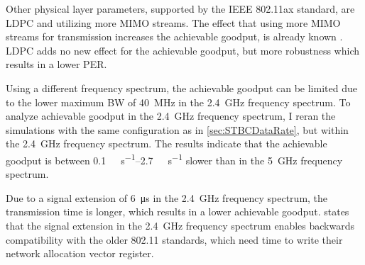 Other physical layer parameters, supported by the IEEE 802.11ax standard, are \ac{LDPC} and utilizing more \ac{MIMO} streams.
The effect that using more \ac{MIMO} streams for transmission increases the achievable goodput, is already known \cite[294-296]{sauter_wireless_2022, ieee_standard_2021ax, ieee_standard_2020}.
\ac{LDPC} adds no new effect for the achievable goodput, but more robustness which results in a lower \ac{PER}.

Using a different frequency spectrum, the achievable goodput can be limited due to the lower maximum \ac{BW} of \SI{40}{\mega\hertz} in the \SI{2.4}{\giga\hertz} frequency spectrum.
To analyze achievable goodput in the \SI{2.4}{\giga\hertz} frequency spectrum, I reran the simulations with the same configuration as in \autoref{sec:STBCDataRate}, but within the \SI{2.4}{\giga\hertz} frequency spectrum.
The results indicate that the achievable goodput is between \SIrange{0.1}{2.7}{\mega\bit\per\second} slower than in the \SI{5}{\giga\hertz} frequency spectrum.

Due to a signal extension of \SI{6}{\micro\second} in the \SI{2.4}{\giga\hertz} frequency spectrum, the transmission time is longer, which results in a lower achievable goodput.
\cite{ieee_standard_2009n} states that the signal extension in the \SI{2.4}{\giga\hertz} frequency spectrum enables
backwards compatibility with the older 802.11 standards, which need time to write their network allocation vector register.

